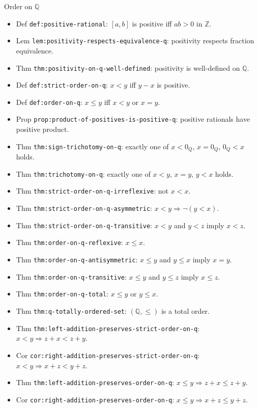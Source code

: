 \begin{topicbox}{Order on \texorpdfstring{$\mathbb{Q}$}{Q}}
\begin{itemize}
  \item Def \texttt{def:positive-rational}: $[a,b]$ is positive iff $ab>0$ in $\mathbb{Z}$.
  \item Lem \texttt{lem:positivity-respects-equivalence-q}: positivity respects fraction equivalence.
  \item Thm \texttt{thm:positivity-on-q-well-defined}: positivity is well-defined on $\mathbb{Q}$.
  \item Def \texttt{def:strict-order-on-q}: $x<y$ iff $y-x$ is positive.
  \item Def \texttt{def:order-on-q}: $x\le y$ iff $x<y$ or $x=y$.
  \item Prop \texttt{prop:product-of-positives-is-positive-q}: positive rationals have positive product.
  \item Thm \texttt{thm:sign-trichotomy-on-q}: exactly one of $x<0_Q$, $x=0_Q$, $0_Q<x$ holds.
  \item Thm \texttt{thm:trichotomy-on-q}: exactly one of $x<y$, $x=y$, $y<x$ holds.
  \item Thm \texttt{thm:strict-order-on-q-irreflexive}: not $x<x$.
  \item Thm \texttt{thm:strict-order-on-q-asymmetric}: $x<y\Rightarrow\neg(y<x)$.
  \item Thm \texttt{thm:strict-order-on-q-transitive}: $x<y$ and $y<z$ imply $x<z$.
  \item Thm \texttt{thm:order-on-q-reflexive}: $x\le x$.
  \item Thm \texttt{thm:order-on-q-antisymmetric}: $x\le y$ and $y\le x$ imply $x=y$.
  \item Thm \texttt{thm:order-on-q-transitive}: $x\le y$ and $y\le z$ imply $x\le z$.
  \item Thm \texttt{thm:order-on-q-total}: $x\le y$ or $y\le x$.
  \item Thm \texttt{thm:q-totally-ordered-set}: $(\mathbb{Q},\le)$ is a total order.
  \item Thm \texttt{thm:left-addition-preserves-strict-order-on-q}: $x<y\Rightarrow z+x<z+y$.
  \item Cor \texttt{cor:right-addition-preserves-strict-order-on-q}: $x<y\Rightarrow x+z<y+z$.
  \item Thm \texttt{thm:left-addition-preserves-order-on-q}: $x\le y\Rightarrow z+x\le z+y$.
  \item Cor \texttt{cor:right-addition-preserves-order-on-q}: $x\le y\Rightarrow x+z\le y+z$.

\end{itemize}
\end{topicbox}
